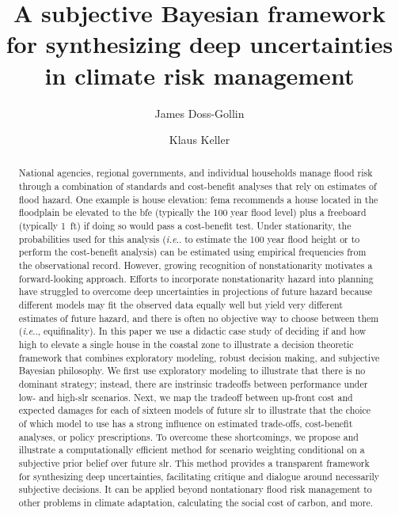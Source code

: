 \documentclass[11pt]{article}
\title{A subjective Bayesian framework for synthesizing deep uncertainties in climate risk management}
\author[1]{James Doss-Gollin}
\author[2]{Klaus Keller}
\affil[1]{Department of Civil and Environmental Engineering, Rice University}
\affil[2]{Thayer School of Engineering, Dartmouth College}
\makeatletter
\DeclareRobustCommand\onedot{\futurelet\@let@token\@onedot}
\def\@onedot{\ifx\@let@token.\else.\null\fi\xspace}
\def\ie{\emph{i.e}\onedot} \def\Ie{\emph{I.e}\onedot}
\DeclareRobustCommand\onedot{\futurelet\@let@token\@onedot}
\def\@onedot{\ifx\@let@token.\else.\null\fi\xspace}
\def\ie{\emph{i.e}\onedot} \def\Ie{\emph{I.e}\onedot}
\makeatother
\begin{document}
\maketitle
\thispagestyle{empty}

\begin{abstract}
    National agencies, regional governments, and individual households manage flood risk through a combination of standards and cost-benefit analyses that rely on estimates of flood hazard.
    One example is house elevation: \acrlong{fema} recommends a house located in the floodplain be elevated to the \acrlong{bfe} (typically the 100 year flood level) plus a freeboard (typically \SI{1}{ft}) if doing so would pass a cost-benefit test.
    Under stationarity, the probabilities used for this analysis (\ie to estimate the 100 year flood height or to perform the cost-benefit analysis) can be estimated using empirical frequencies from the observational record.
    However, growing recognition of nonstationarity motivates a forward-looking approach.
    Efforts to incorporate nonstationarity hazard into planning have struggled to overcome deep uncertainties in projections of future hazard because different models  may fit the observed data equally well but yield very different estimates of future hazard, and there is often no objective way to choose between them (\ie, equifinality).
    In this paper we use a didactic case study of deciding if and how high to elevate a single house in the coastal zone to illustrate a decision theoretic framework that combines exploratory modeling, robust decision making, and subjective Bayesian philosophy.
    We first use exploratory modeling to illustrate that there is no dominant strategy; instead, there are instrinsic tradeoffs between performance under low- and high-\gls{slr} scenarios.
    Next, we map the tradeoff between up-front cost and expected damages for each of sixteen models of future \gls{slr} to illustrate that the choice of which model to use has a strong influence on estimated trade-offs, cost-benefit analyses, or policy prescriptions.
    To overcome these shortcomings, we propose and illustrate a computationally efficient method for scenario weighting conditional on a subjective prior belief over future \gls{slr}.
    This method provides a transparent framework for synthesizing deep uncertainties, facilitating critique and dialogue around necessarily subjective decisions.
    It can be applied beyond nontationary flood risk management to other problems in climate adaptation, calculating the social cost of carbon, and more.
\end{abstract}
\end{document}
